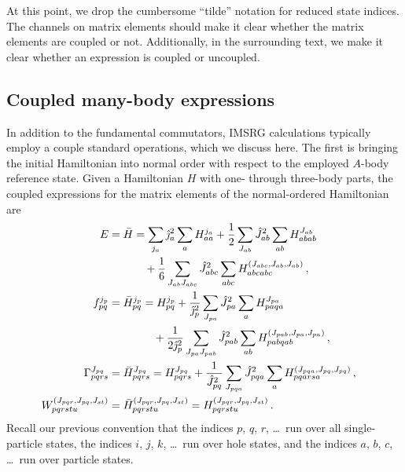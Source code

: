 At this point, we drop the cumbersome ``tilde'' notation
for reduced state indices.
The channels on matrix elements should make it clear
whether the matrix elements are coupled or not.
Additionally, in the surrounding text,
we make it clear whether an expression
is coupled or uncoupled.

\subsection{Coupled many-body expressions}\label{sec:jscheme_many_body_expressions}

In addition to the fundamental commutators,
IMSRG calculations typically employ a couple standard operations,
which we discuss here.
The first is bringing the initial Hamiltonian into normal order
with respect to the employed $A$-body reference state.
Given a Hamiltonian $H$ with one- through three-body parts,
the coupled expressions for
the matrix elements of the normal-ordered Hamiltonian are
\begin{subequations}
  \begin{align}
    \phantom{W_{pqrstu}^{(J_{pqr}, J_{pq}, J_{st})}}
     & \begin{aligned}
      \mathllap{E} = \bar{H} & = \sum_{j_{a}} \hat{\jmath}^{2}_a \sum_{a} H_{aa}^{j_{a}}
      + \frac{1}{2} \sum_{J_{ab}} \hat{J}_{ab}^2 \sum_{ab} H_{abab}^{J_{ab}}             \\
                             & \quad
      + \frac{1}{6} \sum_{J_{ab} J_{abc}} \hat{J}_{abc}^2 \sum_{abc}  H_{abcabc}^{(J_{abc}, J_{ab}, J_{ab})}\,,
    \end{aligned} \\
     & \begin{aligned}
      \mathllap{f_{pq}^{j_p}} = \bar{H}_{pq}^{j_p} &
      = H_{pq}^{j_p}
      + \frac{1}{\hat{\jmath}_{p}^2} \sum_{J_{pa}} \hat{J}_{pa}^2 \sum_{a} H_{paqa}^{J_{pa}} \\
                                                   & \quad
      + \frac{1}{2 \hat{\jmath}_{p}^2} \sum_{J_{pa} J_{pab}} \hat{J}_{pab}^2 \sum_{ab}  H_{pabqab}^{(J_{pab}, J_{pa}, J_{pa})}\,,
    \end{aligned} \\
     & \begin{aligned}
      \mathllap{\Gamma_{pqrs}^{J_{pq}}} = \bar{H}_{pqrs}^{J_{pq}}
       & = H_{pqrs}^{J_{pq}}
      + \frac{1}{\hat{J}_{pq}^2} \sum_{J_{pqa}} \hat{J}_{pqa}^2 \sum_{a} H_{pqarsa}^{(J_{pqa}, J_{pq}, J_{pq})} \,,
    \end{aligned} \\
     & \begin{aligned}
      \mathllap{W_{pqrstu}^{(J_{pqr}, J_{pq}, J_{st})}} = \bar{H}_{pqrstu}^{(J_{pqr}, J_{pq}, J_{st})} & = H_{pqrstu}^{(J_{pqr}, J_{pq}, J_{st})} \,.
    \end{aligned}
  \end{align}
\end{subequations}
Recall our previous convention that
the indices $p$, $q$, $r$, \ldots\ run over all single-particle states,
the indices $i$, $j$, $k$, \ldots\ run over hole states,
and the indices $a$, $b$, $c$, \ldots\ run over particle states.

